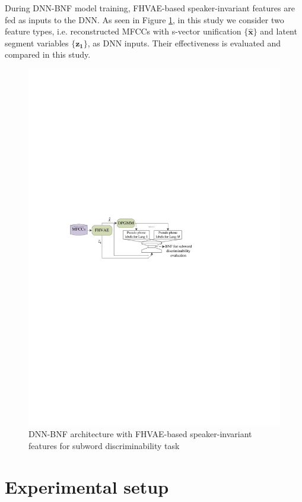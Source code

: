 \documentclass[a4paper]{article}
\begin{document}
During  DNN-BNF model training,  FHVAE-based speaker-invariant features are  fed as  inputs to the DNN. As seen in Figure \ref{fig:framework}, in this study we consider two feature types, i.e.  reconstructed MFCCs with s-vector unification $\{\bm{\hat{x}}\}$  and latent segment variables $\{\bm{z_1}\}$, as DNN inputs. Their effectiveness is evaluated and compared in this study.  
\begin{figure}[t]
    \centering
    \includegraphics[width=0.9\linewidth]{framework.pdf}
    \caption{DNN-BNF architecture with FHVAE-based speaker-invariant features for subword discriminability task}
    \label{fig:framework}
\end{figure}
\section{Experimental setup}
\end{document}
